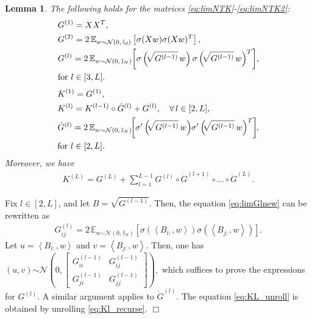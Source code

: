 \documentclass[11pt]{article}
\newcommand{\E}{\mathbb{E}}
\newcommand{\distas}[1]{\mathbin{\overset{#1}{\sim}}}
\newtheorem{lemma}[theorem]{Lemma}
\newenvironment{proof}{\par\noindent{\bf Proof:\ }}{\hfill$\Box$\\[2mm]}
\newcommand{\Id}{\mathbb{I}}
\newcommand{\inner}[1]{\left\langle#1\right\rangle}
\begin{document}
\begin{lemma}\label{lem:limNTK_matform}
    The following holds for the matrices \eqref{eq:limNTK}-\eqref{eq:limNTK2}:
    \begin{align}
	&G^{(1)}=XX^T,\nonumber\\
	&G^{(2)} = 2\,\E_{w\distas{}\mathcal{N}(0,\, \Id_d)} \left[\sigma(Xw)\sigma(Xw)^T\right],\nonumber\\
	&G^{(l)} = 2\,\E_{w\distas{}\mathcal{N}(0,\, \Id_N)}\hspace{-.2em} \left[\sigma\left(\hspace{-.2em}\sqrt{G^{(l-1)}}\,w\right) \sigma\left(\hspace{-.2em}\sqrt{G^{(l-1)}}\,w\right)^T\right]\hspace{-.2em},\nonumber\\
	&\textrm{for } l\in[3,L].\label{eq:limGlnew}
    \end{align}
    \begin{align}
	&K^{(1)}=G^{(1)},\nonumber\\
	&K^{(l)} = K^{(l-1)} \circ \dot{G}^{(l)} + G^{(l)}, \quad\forall\,l\in[2,L],\label{eq:Kl_recurse} \\
	&\dot{G}^{(l)}=2\,\E_{w\distas{}\mathcal{N}(0,\, \Id_N)}\hspace{-.3em} \left[\sigma'\left(\hspace{-.3em}\sqrt{G^{(l-1)}}\,w\right)\hspace{-.2em} \sigma'\left(\hspace{-.3em}\sqrt{G^{(l-1)}}\,w\right)^T\right] \hspace{-.3em}\nonumber,\\
	&\textrm{for } l\in[2,L] \nonumber.
    \end{align}
    Moreover, we have
    \vspace{-5pt}
    \begin{align}\label{eq:KL_unroll}
	K^{(L)} = G^{(L)}\!+\!\sum_{l=1}^{L-1} G^{(l)} \circ \dot{G}^{(l+1)}\circ\ldots\circ\dot{G}^{(L)}.
    \end{align}
\end{lemma}
        \vspace{-5pt}
\begin{proof}
    Fix $l\in[2,L]$, and let $B=\sqrt{G^{(l-1)}}.$ 
    Then, 
    the equation \eqref{eq:limGlnew} can be rewritten as
    \begin{align*}
	G^{(l)}_{ij}
	=2\,\E_{w\distas{}\mathcal{N}(0,\, \Id_N)} \left[\sigma\left(\inner{B_{i:},w}\right) \sigma\left(\inner{B_{j:},w}\right)\right].
    \end{align*}
    Let $u=\inner{B_{i:},w}$ and $v=\inner{B_{j:},w}.$
    Then, one has $(u,v)\distas{}\mathcal{N}\left(0,\begin{bmatrix}G^{(l-1)}_{ii} & G^{(l-1)}_{ij}\\G^{(l-1)}_{ji} & G^{(l-1)}_{jj}\end{bmatrix}\right),$ which suffices to prove the expressions for $G^{(l)}$.
    A similar argument applies to $\dot{G}^{(l)}.$
    The equation \eqref{eq:KL_unroll} is obtained by unrolling \eqref{eq:Kl_recurse}.
\end{proof}
\end{document}
